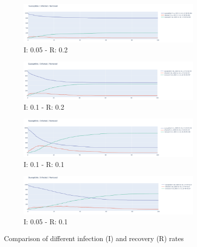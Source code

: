 \begin{figure}[H]
 \centering
 \begin{subfigure}[b]{\textwidth}
     \centering
     \includegraphics[width=\textwidth]{images/2-5a.png}
    \caption{I: 0.05 - R: 0.2}
    \label{fig: 5a}
 \end{subfigure}
 \begin{subfigure}[b]{\textwidth}
      \centering
     \includegraphics[width=\textwidth]{images/2-5b.png}
     \caption{I: 0.1 - R: 0.2}
     \label{fig: 5b}
 \end{subfigure}
 \begin{subfigure}[b]{\textwidth}
      \centering
     \includegraphics[width=\textwidth]{images/2-5c.png}
     \caption{I: 0.1 - R: 0.1}
     \label{fig: 5c}
 \end{subfigure}
 \begin{subfigure}[b]{\textwidth}
      \centering
     \includegraphics[width=\textwidth]{images/2-5d.png}
     \caption{I: 0.05 - R: 0.1}
     \label{fig: 5d}
 \end{subfigure}
 \caption{Comparison of different infection (I) and recovery (R) rates}
 \label{fig: 5ad}
\end{figure}

